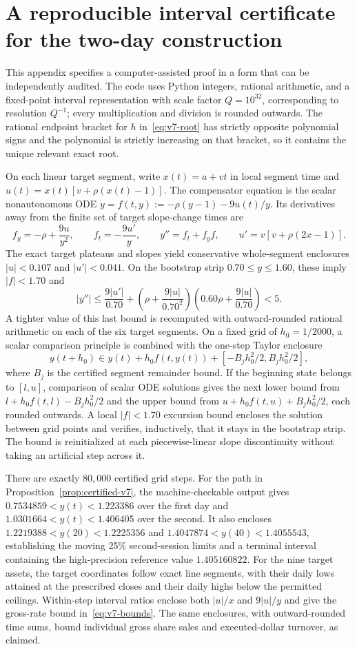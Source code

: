\documentclass[review,hidelinks,onefignum,onetabnum]{siamonline250211}
\begin{document}
\section{A reproducible interval certificate for the two-day construction}\label{app:v7certificate}
This appendix specifies a computer-assisted proof in a form that can be independently audited. The code  uses Python integers, rational arithmetic, and a fixed-point interval representation with scale factor $Q=10^{32}$, corresponding to resolution $Q^{-1}$; every multiplication and division is rounded outwards. The rational endpoint bracket for $h$ in~\eqref{eq:v7-root} has strictly opposite polynomial signs and the polynomial is strictly increasing on that bracket, so it contains the unique relevant exact root.

On each linear target segment, write $x(t)=a+vt$ in local segment time and $u(t)=x(t)[v+\rho(x(t)-1)]$. The compensator equation is the scalar nonautonomous ODE $\dot y=f(t,y):=-\rho(y-1)-9u(t)/y$. Its derivatives away from the finite set of target slope-change times are
\[
f_y=-\rho+\frac{9u}{y^2},\qquad f_t=-\frac{9u'}y,\qquad
 y''=f_t+f_y f,\qquad u'=v[v+\rho(2x-1)].
\]
The exact target plateaus and slopes yield conservative whole-segment enclosures $|u|<0.107$ and $|u'|<0.041$. On the bootstrap strip $0.70\le y\le1.60$, these imply $|f|<1.70$ and
\[
|y''|\le\frac{9|u'|}{0.70}
+\left(\rho+\frac{9|u|}{0.70^2}\right)
\left(0.60\rho+\frac{9|u|}{0.70}\right)<5.
\]
A tighter value of this last bound is recomputed with outward-rounded rational arithmetic on each of the six target segments. On a fixed grid of $h_0=1/2000$, a scalar comparison principle is combined with the one-step Taylor enclosure
\[
 y(t+h_0)\in y(t)+h_0 f(t,y(t))+[-B_j h_0^2/2,B_j h_0^2/2],
\]
where $B_j$ is the certified segment remainder bound. If the beginning state belongs to $[l,u]$, comparison of scalar ODE solutions gives the next lower bound from $l+h_0 f(t,l)-B_jh_0^2/2$ and the upper bound from $u+h_0 f(t,u)+B_jh_0^2/2$, each rounded outwards. A local $|f|<1.70$ excursion bound encloses the solution between grid points and verifies, inductively, that it stays in the bootstrap strip. The bound is reinitialized at each piecewise-linear slope discontinuity without taking an artificial step across it.

There are exactly $80,000$ certified grid steps. For the path in Proposition~\ref{prop:certified-v7}, the machine-checkable output gives $0.7534859<y(t)<1.223386$ over the first day and $1.0301664<y(t)<1.406405$ over the second. It also encloses $1.2219388<y(20)<1.2225356$ and
$1.4047874<y(40)<1.4055543$, establishing the moving 25\% second-session limits and a terminal interval containing the high-precision reference value $1.405160822$. For the nine target assets, the target coordinates follow exact line segments, with their daily lows attained at the prescribed closes and their daily highs below the permitted ceilings. Within-step interval ratios enclose both $|u|/x$ and $9|u|/y$ and give the gross-rate bound in~\eqref{eq:v7-bounds}. The same enclosures, with outward-rounded time sums, bound individual gross share sales and executed-dollar turnover, as claimed.
\end{document}
